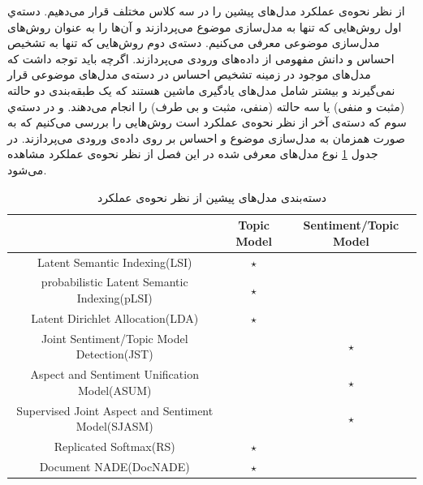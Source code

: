 از نظر نحوه‌ی عملکرد مدل‌های پیشین را در سه‌  کلاس مختلف قرار می‌‌دهیم. دسته‌ي اول روش‌هایی که تنها به مدل‌سازی موضوع می‌‌پردازند و آن‌ها را به عنوان روش‌های مدل‌سازی موضوعی معرفی‌ می‌‌کنیم. دسته‌ی دوم روش‌هایی که تنها به تشخیص احساس و دانش مفهومی‌ از داده‌های ورودی می‌‌پردازند. اگرچه باید توجه داشت که مدل‌های موجود در زمینه تشخیص احساس در دسته‌ی مدل‌های موضوعی قرار نمی‌‌گیرند و بیشتر شامل مدل‌های یادگیری ماشین هستند که یک طبقه‌بندی
 دو حالته (مثبت و منفی‌) یا سه‌ حالته (منفی‌، مثبت و بی‌ طرف) را انجام می‌‌دهند. 
و در دسته‌‌ي سوم که دسته‌ی آخر از نظر نحوه‌ی عملکرد است روش‌هایی را بررسی می‌کنیم که به صورت همزمان به مدل‌سازی موضوع و احساس بر روی داده‌ی ورودی می‌‌پردازند.  در جدول
\ref{tabel3-2}
نوع مدل‌های معرفی‌ شده در این فصل از نظر نحو‌ه‌ی عملکرد مشاهده می‌‌شود.
\begin{table}[!h]
	\centering
	\begin{latin}
		\begin{tabular}{|c|c|c|}
			\hline
			                         & Topic Model & Sentiment/Topic Model \\ \hline
			       Latent Semantic Indexing(LSI)         &   $\star$   &  \\ \hline
			probabilistic Latent Semantic Indexing(pLSI) &   $\star$   &  \\ \hline
			      Latent Dirichlet Allocation(LDA)       &   $\star$   &  \\ \hline
			 Joint Sentiment/Topic Model Detection(JST)  &             &        $\star$        \\ \hline
			Aspect and Sentiment Unification Model(ASUM) &             &        $\star$        \\ \hline
      Supervised Joint Aspect and Sentiment Model(SJASM) &             &        $\star$        \\ \hline
			           Replicated Softmax(RS)            &   $\star$   &  \\ \hline
			           Document NADE(DocNADE)            &   $\star$   &  \\ \hline
		\end{tabular}
	\end{latin}
	\caption{دسته‌بندی مدل‌های پیشین از نظر نحوه‌ی عملکرد}
	\label{tabel3-2}
\end{table}



